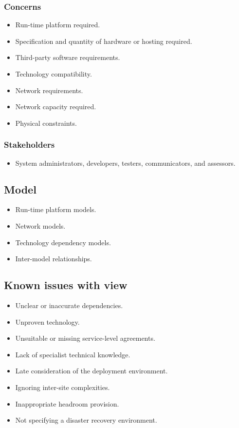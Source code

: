\subsubsection{Concerns}

\begin{itemize}
\item Run-time platform required.
\item Specification and quantity of hardware or hosting required.
\item Third-party software requirements.
\item Technology compatibility.
\item Network requirements.
\item Network capacity required.
\item Physical constraints.
\end{itemize}

\subsubsection{Stakeholders}

\begin{itemize}
\item System administrators, developers, testers, communicators, and assessors.
\end{itemize}

\subsection{Model}

\begin{itemize}
\item Run-time platform models.
\item Network models.
\item Technology dependency models.
\item Inter-model relationships.
\end{itemize}

\subsection{Known issues with view}

\begin{itemize}
\item Unclear or inaccurate dependencies.
\item Unproven technology.
\item Unsuitable or missing service-level agreements.
\item Lack of specialist technical knowledge.
\item Late consideration of the deployment environment.
\item Ignoring inter-site complexities.
\item Inappropriate headroom provision.
\item Not specifying a disaster recovery environment.
\end{itemize}

